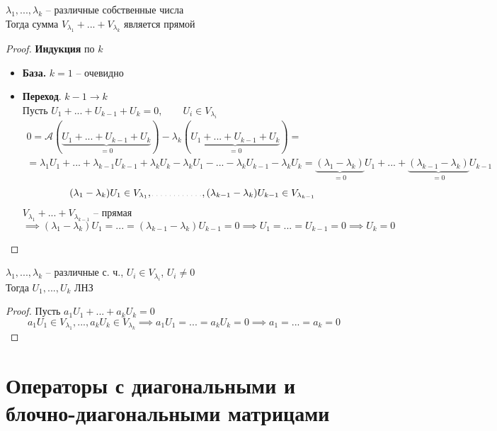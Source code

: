 \begin{theorem}
	$ \lambda_1, ..., \lambda_k $ -- различные собственные числа \\
	Тогда сумма $ V_{\lambda_1} + ... + V_{\lambda_k} $ является прямой
\end{theorem}

\begin{proof}
	\textbf{Индукция} по $ k $
	\begin{itemize}
		\item \textbf{База.} $ k = 1 $ -- очевидно
		\item \textbf{Переход}. $ k - 1 \to k $ \\
		Пусть $ U_1 + ... + U_{k - 1} + U_k = 0, \qquad U_i \in V_{\lambda_i} $
		\begin{multline*}
			0 = \mathcal{A}(\underbrace{U_1 + ... + U_{k - 1} + U_k}_{= 0 }) - \lambda_k(\underbrace{U_1 + ... + U_{k - 1} + U_k}_{= 0 }) = \\
			= \lambda_1U_1 + ... + \lambda_{k - 1}U_{k - 1} + \lambda_kU_k - \lambda_kU_1 - ... - \lambda_kU_{k - 1} - \lambda_kU_k = \underbrace{(\lambda_1 - \lambda_k)}_{= 0}U_1 + ... + \underbrace{(\lambda_{k - 1} - \lambda_k)}_{= 0}U_{k - 1}
		\end{multline*}
		$$ (\lambda_1 - \lambda_k)U_1 \in V_{\lambda_1}, \widedots[5em], (\lambda_{k - 1} - \lambda_k)U_{k - 1} \in V_{\lambda_{k - 1}} $$
		$ V_{\lambda_1} + ... + V_{\lambda_{k - 1}} $ -- прямая
		$$ \implies (\lambda_1 - \lambda_k)U_1 = ... = (\lambda_{k - 1} - \lambda_k)U_{k - 1} = 0 \implies U_1 = ... = U_{k - 1} = 0 \implies U_k = 0 $$
	\end{itemize}
\end{proof}

\begin{implication}
	$ \lambda_1, ..., \lambda_k $ -- различные с. ч., $ U_i \in V_{\lambda_i} $, $ U_i \ne 0 $ \\
	Тогда $ U_1, ..., U_k $ ЛНЗ
\end{implication}

\begin{proof}
	Пусть $ a_1U_1 + ... + a_kU_k = 0 $
	$$ a_1U_1 \in V_{\lambda_1}, ..., a_kU_k \in V_{\lambda_k} \implies a_1U_1 = ... = a_kU_k = 0 \implies a_1 = ... = a_k = 0 $$
\end{proof}

\section{Операторы с диагональными и блочно-диагональными матрицами}

